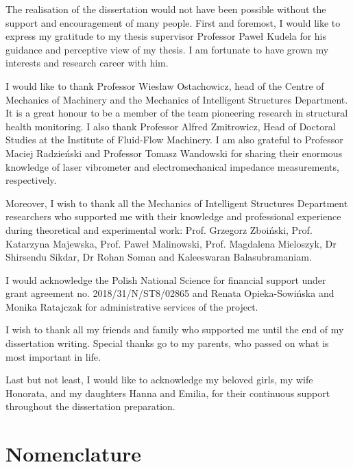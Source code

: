 \documentclass[11pt,a4paper,final]{report}
\theoremstyle{plain}
\begin{document}
\beforepreface
The realisation of the dissertation would not have been possible without the support and encouragement of many people.
First and foremost, I would like to express my gratitude to my thesis supervisor Professor Paweł Kudela for his guidance and perceptive view of my thesis.
I am fortunate to have grown my interests and research career with him.

I would like to thank Professor Wiesław Ostachowicz, head of the Centre of Mechanics of Machinery and the Mechanics of Intelligent Structures Department.
It is a great honour to be a member of the team pioneering research in structural health monitoring.
I also thank Professor Alfred Zmitrowicz, Head of Doctoral Studies at the Institute of Fluid-Flow Machinery.
I am also grateful to Professor Maciej Radzieński and Professor Tomasz Wandowski for sharing their enormous knowledge of laser vibrometer and electromechanical impedance measurements, respectively.

Moreover, I wish to thank all the Mechanics of Intelligent Structures Department researchers who supported me with their knowledge and professional experience during theoretical and experimental work: Prof. Grzegorz Zboiński, Prof. Katarzyna Majewska, Prof. Paweł Malinowski, Prof. Magdalena Mieloszyk, Dr Shirsendu Sikdar, Dr Rohan Soman and Kaleeswaran Balasubramaniam.

I would acknowledge the Polish National Science for financial support under grant agreement no. 2018/31/N/ST8/02865 and Renata Opieka-Sowińska and Monika Ratajczak for administrative services of the project.

I wish to thank all my friends and family who supported me until the end of my dissertation writing.
Special thanks go to my parents, who passed on what is most important in life.

Last but not least, I would like to acknowledge my beloved girls, my wife Honorata, and my daughters Hanna and Emilia, for their continuous support throughout the dissertation preparation.
\afterpreface\clearpage{}
\clearpage{}

\newtheorem{theorem}{Theorem}[section]
\newtheorem{lemma}[theorem]{Lemma}
\newcommand{\bfx}{{\ensuremath{\mathbf{x}}}}
\clearpage{}
\clearpage{}

\chapter*{Nomenclature}
\label{nomenclature}
\end{document}
